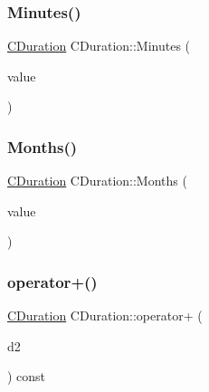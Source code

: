 \mbox{\label{class_c_duration_a33ff2602f80347e80273fedcc4acb026}} 
\subsubsection{\texorpdfstring{Minutes()}{Minutes()}}
{\footnotesize\ttfamily \mbox{\hyperlink{class_c_duration}{C\+Duration}} C\+Duration\+::\+Minutes (\begin{DoxyParamCaption}\item[{long long int}]{value }\end{DoxyParamCaption})\hspace{0.3cm}{\ttfamily [static]}}

\mbox{\label{class_c_duration_a15e994d6b3ba80f2e4dd37b8120e4807}} 
\subsubsection{\texorpdfstring{Months()}{Months()}}
{\footnotesize\ttfamily \mbox{\hyperlink{class_c_duration}{C\+Duration}} C\+Duration\+::\+Months (\begin{DoxyParamCaption}\item[{long long int}]{value }\end{DoxyParamCaption})\hspace{0.3cm}{\ttfamily [static]}}

\mbox{\label{class_c_duration_a54d59b75c2785839f0fe0261b2f404dc}} 
\subsubsection{\texorpdfstring{operator+()}{operator+()}}
{\footnotesize\ttfamily \mbox{\hyperlink{class_c_duration}{C\+Duration}} C\+Duration\+::operator+ (\begin{DoxyParamCaption}\item[{const \mbox{\hyperlink{class_c_duration}{C\+Duration}} \&}]{d2 }\end{DoxyParamCaption}) const}

\mbox{\label{class_c_duration_a9162573d7401542397c29c7b1b6b2475}} 

